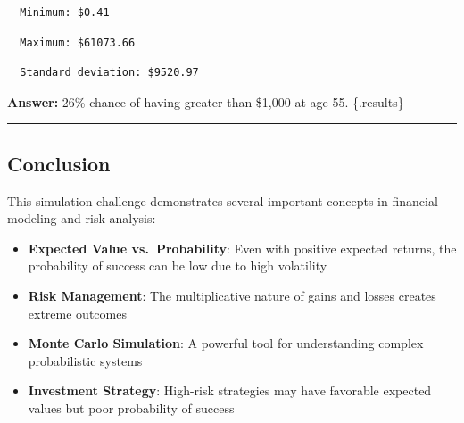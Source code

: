 \documentclass[
  letterpaper,
  DIV=11,
  numbers=noendperiod]{scrartcl}
\newenvironment{Shaded}{\begin{snugshade}}{\end{snugshade}}
\newcommand{\AttributeTok}[1]{\textcolor[rgb]{0.40,0.45,0.13}{#1}}
\newcommand{\DecValTok}[1]{\textcolor[rgb]{0.68,0.00,0.00}{#1}}
\newcommand{\FunctionTok}[1]{\textcolor[rgb]{0.28,0.35,0.67}{#1}}
\newcommand{\NormalTok}[1]{\textcolor[rgb]{0.00,0.23,0.31}{#1}}
\newcommand{\SpecialCharTok}[1]{\textcolor[rgb]{0.37,0.37,0.37}{#1}}
\newcommand{\StringTok}[1]{\textcolor[rgb]{0.13,0.47,0.30}{#1}}
\providecommand{\tightlist}{%
  \setlength{\itemsep}{0pt}\setlength{\parskip}{0pt}}
\begin{document}
\begin{verbatim}
  Minimum: $0.41
\end{verbatim}

\begin{Shaded}
\end{Shaded}

\begin{verbatim}
  Maximum: $61073.66
\end{verbatim}

\begin{Shaded}
\end{Shaded}

\begin{verbatim}
  Standard deviation: $9520.97
\end{verbatim}

\textbf{Answer:} 26\% chance of having greater than \$1,000 at age 55.
\{.results\}

\begin{center}\rule{0.5\linewidth}{0.5pt}\end{center}

\subsection{Conclusion}\label{conclusion}

This simulation challenge demonstrates several important concepts in
financial modeling and risk analysis:

\begin{itemize}
\tightlist
\item
  \textbf{Expected Value vs.~Probability}: Even with positive expected
  returns, the probability of success can be low due to high volatility
\item
  \textbf{Risk Management}: The multiplicative nature of gains and
  losses creates extreme outcomes
\item
  \textbf{Monte Carlo Simulation}: A powerful tool for understanding
  complex probabilistic systems
\item
  \textbf{Investment Strategy}: High-risk strategies may have favorable
  expected values but poor probability of success
\end{itemize}
\end{document}
